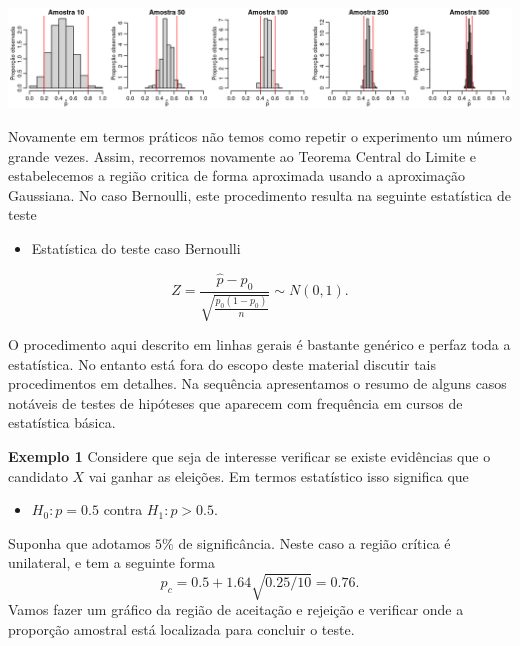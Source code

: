 \documentclass[
  10pt,
  a4paper]{book}
\providecommand{\tightlist}{%
  \setlength{\itemsep}{0pt}\setlength{\parskip}{0pt}}
\begin{document}
\begin{center}\includegraphics[width=0.99\linewidth]{figures/unnamed-chunk-391-1} \end{center}

Novamente em termos práticos não temos como repetir o experimento um número grande vezes. Assim, recorremos novamente ao Teorema Central do Limite e estabelecemos a região critica de forma aproximada usando a aproximação Gaussiana. No caso Bernoulli, este procedimento resulta na seguinte estatística de teste

\begin{itemize}
\tightlist
\item
  Estatística do teste caso Bernoulli
\end{itemize}

\[
Z = \frac{\hat{p} - p_0}{\sqrt{\frac{p_0(1-p_0)}{n}}} \sim N(0,1).
\]

O procedimento aqui descrito em linhas gerais é bastante genérico e perfaz toda a estatística. No entanto está fora do escopo deste material discutir tais procedimentos em detalhes. Na sequência apresentamos o resumo de alguns casos notáveis de testes de hipóteses que aparecem com frequência em cursos de estatística básica.

\textbf{Exemplo 1} Considere que seja de interesse verificar se existe evidências que o candidato \(X\) vai ganhar as eleições. Em termos estatístico isso significa que

\begin{itemize}
\tightlist
\item
  \(H_0: p = 0.5\) contra \(H_1:p > 0.5.\)
\end{itemize}

Suponha que adotamos \(5\%\) de significância.
Neste caso a região crítica é unilateral, e tem a seguinte forma
\[p_c = 0.5 + 1.64\sqrt{0.25/10} = 0.76.\]
Vamos fazer um gráfico da região de aceitação e rejeição e verificar onde a proporção amostral está localizada para concluir o teste.
\end{document}
